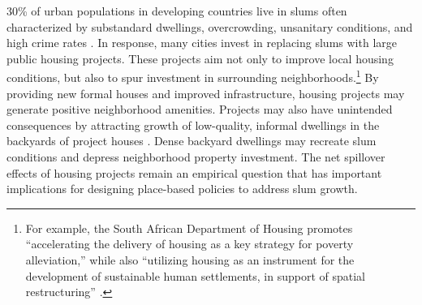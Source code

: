 \documentclass[12pt]{article}
\begin{document}




30\% of urban populations in developing countries live in slums often characterized by substandard dwellings, overcrowding, unsanitary conditions, and high crime rates \citep{mdg}.  In response, many cities invest in replacing slums with large public housing projects.  These projects aim not only to improve local housing conditions, but also to spur investment in surrounding neighborhoods.\footnote{For example, the South African Department of Housing promotes ``accelerating the delivery of housing as a key strategy for poverty alleviation,'' while also ``utilizing housing as an instrument for the development of sustainable human settlements, in support of spatial restructuring'' \citep{bng}.}  By providing new formal houses and improved infrastructure, housing projects may generate positive neighborhood amenities.  Projects may also have unintended consequences by attracting growth of low-quality, informal dwellings in the backyards of project houses \citep{Brueckner2018backyarding}.  Dense backyard dwellings may recreate slum conditions and depress neighborhood property investment.  The net spillover effects of housing projects remain an empirical question that has important implications for designing place-based policies to address slum growth.
\end{document}
